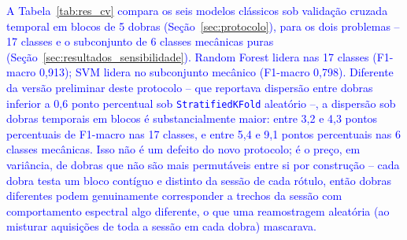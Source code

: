 \documentclass[times,final]{elsarticle}
\begin{document}
\textcolor{blue}{A Tabela~\ref{tab:res_cv} compara os seis modelos clássicos sob validação cruzada temporal em blocos de 5 dobras (Seção~\ref{sec:protocolo}), para os dois problemas -- 17 classes e o subconjunto de 6 classes mecânicas puras (Seção~\ref{sec:resultados_sensibilidade}). Random Forest lidera nas 17 classes (F1-macro 0,913); SVM lidera no subconjunto mecânico (F1-macro 0,798). Diferente da versão preliminar deste protocolo -- que reportava dispersão entre dobras inferior a 0,6 ponto percentual sob \texttt{StratifiedKFold} aleatório --, a dispersão sob dobras temporais em blocos é substancialmente maior: entre 3,2 e 4,3 pontos percentuais de F1-macro nas 17 classes, e entre 5,4 e 9,1 pontos percentuais nas 6 classes mecânicas. Isso não é um defeito do novo protocolo; é o preço, em variância, de dobras que não são mais permutáveis entre si por construção -- cada dobra testa um bloco contíguo e distinto da sessão de cada rótulo, então dobras diferentes podem genuinamente corresponder a trechos da sessão com comportamento espectral algo diferente, o que uma reamostragem aleatória (ao misturar aquisições de toda a sessão em cada dobra) mascarava.}
\end{document}
